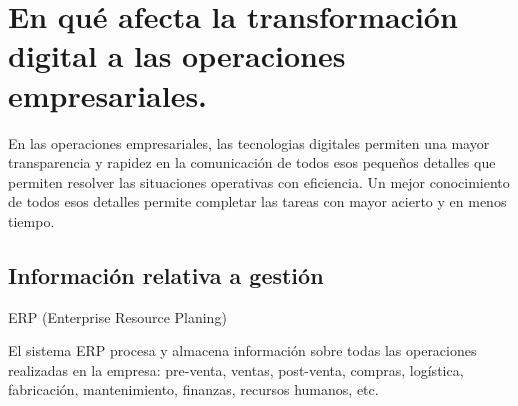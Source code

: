 \documentclass[spanish,12pt,a4paper,final,oneside]{book}
\begin{document}
\chapter{En qué afecta la transformación digital a las operaciones empresariales.}

En las operaciones empresariales, las tecnologias digitales permiten una mayor transparencia y rapidez en la comunicación de todos esos pequeños detalles que permiten resolver las situaciones operativas con eficiencia. Un mejor conocimiento de todos esos detalles permite completar las tareas con mayor acierto y en menos tiempo.

\section{Información relativa a gestión} \label{ERP}
ERP (Enterprise Resource Planing)

El sistema ERP procesa y almacena información sobre todas las operaciones realizadas en la empresa: pre-venta, ventas, post-venta, compras, logística, fabricación, mantenimiento, finanzas, recursos humanos, etc.
\end{document}

